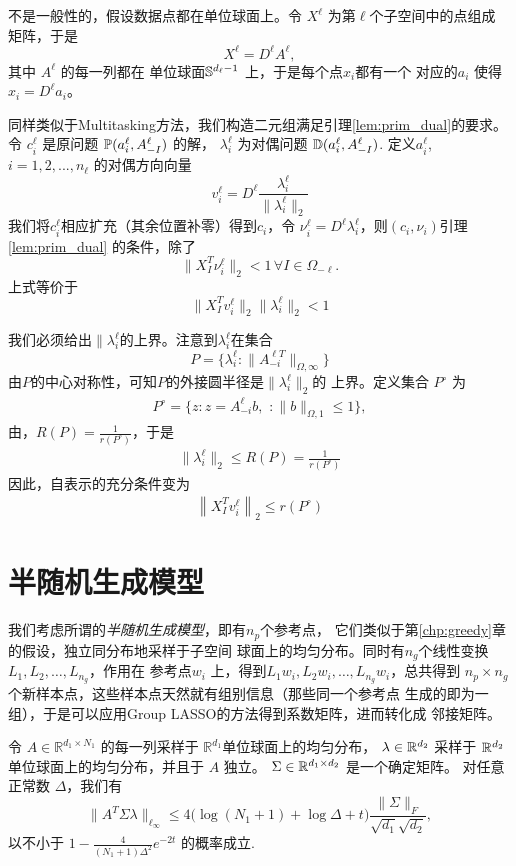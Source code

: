 \documentclass[main.tex]{subfiles}
\begin{document}
不是一般性的，假设数据点都在单位球面上。令 $X^\ell$ 为第$\ell$个子空间中的点组成
矩阵，于是
$$ X^\ell = D^{\ell} A^{\ell} ,$$ 
其中 $A^\ell$ 的每一列都在 单位球面$\S^{d_\ell-1}$ 上，于是每个点$x_i$都有一个
对应的$a_i$ 使得$x_i=D^{\ell}a_i$。

同样类似于Multitasking方法，我们构造二元组满足引理\ref{lem:prim_dual}的要求。
令 $c_{i}^{\ell}$ 是原问题 $\P(a_i^{\ell}, A_{-I}^{\ell})$ 的解，
$\lambda_i^{\ell}$ 为对偶问题 $\D(a_{i}^{\ell}, A_{-I}^{\ell})$.
定义$a_{i}^{\ell}$, $i = 1,2,...,n_\ell$ 的对偶方向向量
$$ v_i^\ell = D^{\ell} \frac{\lambda_i^\ell}{\|\lambda_i^\ell \|_2} $$
我们将$c_i^{\ell}$相应扩充（其余位置补零）得到$c_i$，令 $\nu_i^\ell
= D^{\ell} \lambda_i^\ell$，则$(c_i, \nu_i)$引理 \ref{lem:prim_dual}
的条件，除了
$$ \| X^T_I \nu_i^\ell\|_2 < 1 \, \forall I \in \Omega_{-\ell}.$$
上式等价于
$$\| X^T_I v_i^\ell\|_2 \|\lambda_i^\ell\|_2 < 1$$

我们必须给出$\|\lambda_i^\ell$的上界。注意到$\lambda_i^\ell$在集合
$$P=\{ \lambda_i^\ell: \|A_{-i}^{\ell T}\|_{\Omega,\infty}\}$$
由$P$的中心对称性，可知$P$的外接圆半径是$\|\lambda_i^\ell\|_2$的
上界。定义集合 $P^\circ$ 为 
\begin{align*} 
  P^\circ = \{ z: z = A_{-i}^{\ell} b,\,\, : \|b\|_{\Omega,1} \leq 1\},
\end{align*} 
由\cite{ball1997intro_convex_geometry}，$R(P) = \frac{1}{r(P^\circ)}$，于是
\begin{align*} 
  \|\lambda_i^\ell \|_2 \leq R(P) = \frac{1}{r(P^\circ)}
\end{align*} 
因此，自表示的充分条件变为
\begin{align} 
  \left\|X_{I}^T v_i^\ell \right\|_{2} \leq r(P^\circ)
  \label{eq:cond1}
\end{align}

\section{半随机生成模型}

我们考虑所谓的\emph{半随机生成模型}，即有$n_p$个参考点，
它们类似于第\ref{chp:greedy}章的假设，独立同分布地采样于子空间
球面上的均匀分布。同时有$n_g$个线性变换$L_1, L_2,\ldots,L_{n_g}$，作用在
参考点$w_i$ 上，得到$L_1 w_i, L_2 w_i, \ldots, L_{n_g} w_i$，总共得到
$n_p \times n_g$个新样本点，这些样本点天然就有组别信息（那些同一个参考点
生成的即为一组），于是可以应用Group LASSO的方法得到系数矩阵，进而转化成
邻接矩阵。

\begin{lemma}
\label{infnormlog}
令 $A\in\mathbb{R}^{d_1\times N_1}$ 的每一列采样于
$\mathbb{R}^{d_1}$单位球面上的均匀分布， $\lambda\in\R^{d_2}$ 
采样于 $\R^{d_2}$ 单位球面上的均匀分布，并且于 $A$ 独立。
$\Sigma\in\R^{d_1\times d_2}$ 是一个确定矩阵。
对任意正常数 $\Delta$，我们有
%
$$
\bigl\|A^T\Sigma\lambda\bigr\|_{\ell_\infty} \le4 \bigl(
\log(N_1+1)+\log \Delta+t \bigr)\frac{\|\Sigma\|_F}{\sqrt{d_1}\sqrt {d_2}},
$$
%
以不小于 $1-\frac{4}{(N_1+1)\Delta^2}e^{-2t}$ 的概率成立.
\end{lemma}
%
\end{document}

